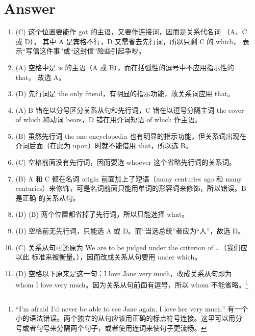 \section{Answer}
\begin{enumerate}
\item (C) 这个位置要能作 got 的主语，又要作连接词，因而是关系代名词
  （A、C 或 D）。 其中 A 是宾格不行，D 又需省去先行词，所以只剩 C 的 which，
  表示“写信这件事”或“这封信”险些引起争吵。


\item (A) 空格中是 is 的主语（A 或 B），而在括弧性的逗号中不应用指示性的 that，
  故选 A。

\item (D) 先行词是 the only friend，有明显的指示功能，故关系词应用 that。

\item (A) B 错在以分号区分关系从句和先行词，C 错在以逗号分隔主词 the cover of which 和动词 bears，D 错在用介词短语 of which 作主语。


\item  (B) 虽然先行词 the one encyclopedia 也有明显的指示功能，但关系词出现在介词后面（在此为 upon）时就不能借用 that，所以选 B。

\item (C) 空格前面没有先行词，因而要选 whoever 这个省略先行词的关系词。

\item (B) A 和 C 都在名词 origin 前面加上了短语（many centuries ago 和 many
  centuries）来修饰，可是名词前面只能用单词的形容词来修饰，所以错误。B 是正确
  的关系从句。

\item {} (D)  (B) 两个位置都省掉了先行词，所以只能选择 what。
\item (D) 空格前无先行词，只能选 A 或 D。而“当选总统”者应为“人”，故选 D。


\item (C) 关系从句可还原为 We are to be judged under the criterion of \ldots（我们应以此
  标准来被衡量。），因而改成关系从句要用 under which。


\item (D) 空格以下原来是这一句：I love Jane very much，改成关系从句即为 whom I
  love very much。因为关系从句前面有逗号，所以 whom 不能省略。\footnote{
    “I'm afraid I'd never be able to see Jane again, I love her very much.”
    有一个小的语法错误。两个独立的从句应该用正确的标点符号连接。这里可以用分
    号或者句号来分隔两个句子，或者使用连词来使句子更流畅。

}
\end{enumerate}
